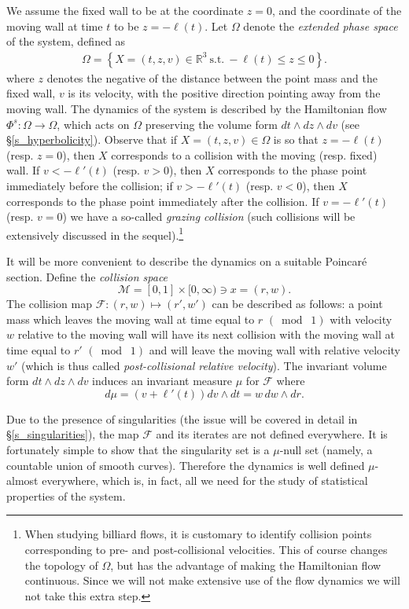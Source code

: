 \documentclass[AHL, Unicode, longabstracts,published]{cedram}
\newcommand{\ct}{r}
\newcommand{\deh}{\mathrm{d}}
\newcommand{\st}{\ \text{s.t.}\ }
\newcommand{\bR}{\mathbb{R}}
\newcommand{\cm}{\mathcal{F}}
\newcommand{\csp}{\mathcal{M}}
\newcommand{\exph}{\Omega}
\newcommand{\flow}[1]{\Phi^{#1}}
\renewcommand{\deh}{d}
\begin{document}
We assume the fixed wall to be at the coordinate $z = 0$, and the coordinate of the moving wall at time $t$ to be $z = -\ell(t)$. Let $\exph$ denote the \emph{extended phase space} of the system, defined as
\begin{align*}
\exph=\left\{X=(t,z,v)\in\bR^3\st -\ell(t)\leq z\leq 0\right\}.
\end{align*}
where $z$ denotes the negative of the distance between the point mass and the fixed wall, $v$ is its velocity, with the positive direction pointing away from the moving wall. The dynamics of the system is described by the Hamiltonian flow $\flow{s}:\exph\to\exph$, which acts on $\exph$ preserving the volume form $\deh t\wedge \deh z \wedge \deh v$ (see \S\ref{s_hyperbolicity}). Observe that if $X = (t,z,v)\in\exph$ is so that $z = -\ell(t)$ (resp. $z = 0$), then $X$ corresponds to a collision with the moving (resp. fixed) wall. If $v < -\ell'(t)$ (resp. $v > 0$), then $X$ corresponds to the phase point immediately before the collision; if $v > -\ell'(t)$ (resp. $v < 0$), then $X$ corresponds to the phase point immediately after the collision. If $v = -\ell'(t)$ (resp. $v = 0$) we have a so-called \emph{grazing collision} (such collisions will be extensively discussed in the sequel).\footnote{\label{fn:discontinuous-flow}
When studying billiard flows, it is customary to identify collision points corresponding to pre- and post-collisional velocities. This of course changes the topology of $\exph$, but has the advantage of making the Hamiltonian flow continuous. Since we will not make extensive use of the flow dynamics we will not take this extra step.}

It will be more convenient to describe the dynamics on a suitable Poincaré section. Define the \emph{collision space}
\[
\csp=[0,1]\times[0,\infty) \ni x =(\ct,w).
\]
The collision map
$\cm:(\ct,w)\mapsto(\ct',w')$ can be described as follows: a point mass which leaves the moving wall at time equal to $\ct$ $(\bmod\; 1)$ with velocity $w$ relative to the moving wall will have its next collision with the moving wall at time equal to $\ct'$ $(\bmod\; 1)$ and will leave the moving wall with relative velocity $w'$ (which is thus called \emph{post-collisional relative velocity}). The invariant volume form $\deh t\wedge \deh z \wedge \deh v$ induces an invariant
measure $\mu$ for $\cm$ where
\[
d\mu=(v+\ell'(t)) dv\wedge dt =
w\,dw\wedge dr.
\]

Due to the presence of singularities (the issue will be covered in detail in \S\ref{s_singularities}), the map $\cm$ and its iterates are not defined everywhere. It is fortunately simple to show that the singularity set is a $\mu$-null set (namely, a countable union of smooth curves). Therefore the dynamics is well defined $\mu$-almost everywhere, which is, in fact, all we need for the study of statistical properties of the system.
\end{document}
